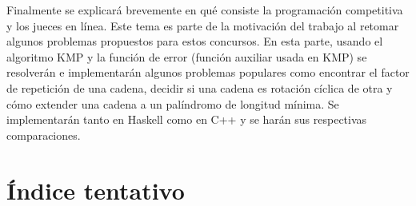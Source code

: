 \documentclass[letterpaper,11pt]{article}
\begin{document}
Finalmente se explicará brevemente en qué consiste la programación competitiva y los jueces en línea.
Este tema es parte de la motivación del trabajo al retomar algunos problemas propuestos para estos concursos.
En esta parte, usando el algoritmo KMP y la función de error (función auxiliar usada en KMP) se resolverán e
implementarán algunos problemas populares como encontrar el factor de repetición de una cadena,
decidir si una cadena es rotación cíclica de otra y cómo extender una cadena a un palíndromo de
longitud mínima. Se implementarán tanto en Haskell como en C++ y se harán sus respectivas
comparaciones.

\section{Índice tentativo}
\end{document}
